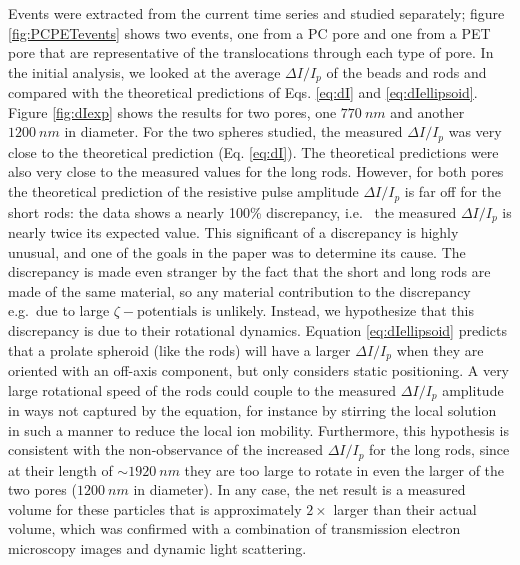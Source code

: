 	
	
		Events were extracted from the current time series and studied separately; figure \ref{fig:PCPETevents} shows two events, one from a PC pore and one from a PET pore that are representative of the translocations through each type of pore. In the initial analysis, we looked at the average $\Delta I/I_{p}$ of the beads and rods and compared with the theoretical predictions of Eqs. \ref{eq:dI} and \ref{eq:dIellipsoid}. Figure \ref{fig:dIexp} shows the results for two pores, one $\SI{770}{nm}$ and another $\SI{1200}{nm}$ in diameter. For the two spheres studied, the measured $\Delta I/I_{p}$ was very close to the theoretical prediction (Eq. \ref{eq:dI}). The theoretical predictions were also very close to the measured values for the long rods. However, for both pores the theoretical prediction of the resistive pulse amplitude $\Delta I/I_{p}$ is far off for the short rods: the data shows a nearly 100\% discrepancy, i.e.~ the measured $\Delta I/I_{p}$ is nearly twice its expected value. This significant of a discrepancy is highly unusual, and one of the goals in the paper was to determine its cause. The discrepancy is made even stranger by the fact that the short and long rods are made of the same material, so any material contribution to the discrepancy e.g.~due to large $\zeta-\mathrm{potentials}$ is unlikely. Instead, we hypothesize that this discrepancy is due to their rotational dynamics. Equation \ref{eq:dIellipsoid} predicts that a prolate spheroid (like the rods) will have a larger $\Delta I/I_{p}$ when they are oriented with an off-axis component, but only considers static positioning. A very large rotational speed of the rods could couple to the measured $\Delta I/I_{p}$ amplitude in ways not captured by the equation, for instance by stirring the local solution in such a manner to reduce the local ion mobility. Furthermore, this hypothesis is consistent with the non-observance of the increased $\Delta I/I_{p}$ for the long rods, since at their length of $\sim\SI{1920}{nm}$ they are too large to rotate in even the larger of the two pores ($\SI{1200}{nm}$ in diameter). In any case, the net result is a measured volume for these particles that is approximately $2\times$ larger than their actual volume, which was confirmed with a combination of transmission electron microscopy images and dynamic light scattering. 
		
